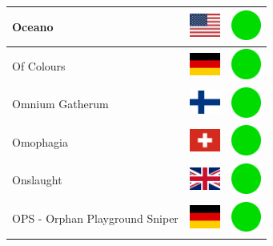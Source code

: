 \documentclass[12pt, a4paper, twoside]{report}
\begin{document}
\begin{center}
\begin{longtable}{|p{5cm}|p{2cm}|p{2cm}|}
Oceano & \includegraphics[width=1cm]{4x3/us} & \includegraphics[width=1cm]{likes/y} \\ \hline
Of Colours & \includegraphics[width=1cm]{4x3/de} & \includegraphics[width=1cm]{likes/y} \\ \hline
Omnium Gatherum & \includegraphics[width=1cm]{4x3/fi} & \includegraphics[width=1cm]{likes/y} \\ \hline
Omophagia & \includegraphics[width=1cm]{4x3/ch} & \includegraphics[width=1cm]{likes/y} \\ \hline
Onslaught & \includegraphics[width=1cm]{4x3/gb} & \includegraphics[width=1cm]{likes/y} \\ \hline
OPS - Orphan Playground Sniper & \includegraphics[width=1cm]{4x3/de} & \includegraphics[width=1cm]{likes/y} \\ \hline

\end{longtable}
\end{center}
\end{document}
